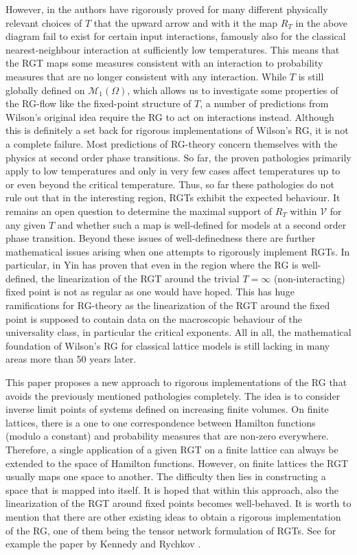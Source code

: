 \documentclass{article}
\begin{document}
However, in \cite{van_Enter_1993} the authors have rigorously proved for many different physically relevant choices of $T$ that the upward arrow and with it the map $R_T$ in the above diagram fail to exist for certain input interactions, famously also for the classical nearest-neighbour interaction at sufficiently low temperatures. This means that the RGT maps some measures consistent with an interaction to probability measures that are no longer consistent with any interaction. While $T$ is still globally defined on $\mathscr{M}_1(\Omega)$, which allows us to investigate some properties of the RG-flow like the fixed-point structure of $T$, a number of predictions from Wilson's original idea require the RG to act on interactions instead. Although this is definitely a set back for rigorous implementations of Wilson's RG, it is not a complete failure. Most predictions of RG-theory concern themselves with the physics at second order phase transitions. So far, the proven pathologies primarily apply to low temperatures and only in very few cases affect temperatures up to or even beyond the critical temperature. Thus, so far these pathologies do not rule out that in the interesting region, RGTs exhibit the expected behaviour. It remains an open question to determine the maximal support of $R_T$ within $\mathscr{V}$ for any given $T$ and whether such a map is well-defined for models at a second order phase transition. Beyond these issues of well-definedness there are further mathematical issues arising when one attempts to rigorously implement RGTs. In particular, in \cite{Yin} Yin has proven that even in the region where the RG is well-defined, the linearization of the RGT around the trivial $T=\infty$ (non-interacting) fixed point is not as regular as one would have hoped. This has huge ramifications for RG-theory as the linearization of the RGT around the fixed point is supposed to contain data on the macroscopic behaviour of the universality class, in particular the critical exponents. All in all, the mathematical foundation of Wilson's RG for classical lattice models is still lacking in many areas more than 50 years later.\medskip

This paper proposes a new approach to rigorous implementations of the RG that avoids the previously mentioned pathologies completely. The idea is to consider inverse limit points of systems defined on increasing finite volumes. On finite lattices, there is a one to one correspondence between Hamilton functions (modulo a constant) and probability measures that are non-zero everywhere. Therefore, a single application of a given RGT on a finite lattice can always be extended to the space of Hamilton functions. However, on finite lattices the RGT usually maps one space to another. The difficulty then lies in constructing a space that is mapped into itself. It is hoped that within this approach, also the linearization of the RGT around fixed points becomes well-behaved. It is worth to mention that there are other existing ideas to obtain a rigorous implementation of the RG, one of them being the tensor network formulation of RGTs. See for example the paper by Kennedy and Rychkov \cite{Slava}. \medskip
\end{document}
